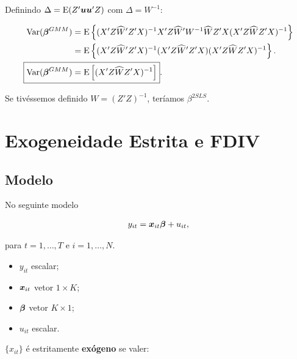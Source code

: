 \documentclass[11pt, oneside, a4paper, article]{article}
\numberwithin{equation}{section}
\begin{document}
\begin{description}
	\noindent
	Definindo $\Delta = \text{E}(Z' \boldsymbol{u}\boldsymbol{u}' Z)$ com $\Delta = W^{-1}$:

	\vspace{-1 em}
	\begin{align*}
		\Var( \betavec^{GMM} ) &=
		\E \left\{ 
			( X' Z \widehat{W}' Z' X )^{-1}
			X' Z \widehat{W}' W^{-1} \widehat{W} Z' X 
			( X' Z \widehat{W} Z' X )^{-1}
		\right\}
		\\ &=
		\E \left\{ 
			( X' Z \widehat{W}' Z' X )^{-1}
			( X' Z \widehat{W}' Z' X )
			( X' Z \widehat{W} Z' X )^{-1}
		\right\}.
		\\
		\Aboxed{
			\Var( \betavec^{GMM} ) &=
			\E \left[
				( X' Z \widehat{W} Z' X )^{-1}
		\right] }.
	\end{align*}

	\noindent
	Se tivéssemos definido $W = (Z'Z)^{-1}$, teríamos $\beta^{2SLS}$.


	\clearpage
	\section{Exogeneidade Estrita e FDIV}


	\subsection{Modelo}

	No seguinte modelo

	\vspace{-1 em}
	\begin{align*} 
		y_{it} = \boldsymbol{x}_{it} \boldsymbol{\beta} + u_{it},
	\end{align*}

	\noindent
	para
	$t = 1, \dots, T$ e $i = 1, \dots, N$.

	\begin{itemize}\itemsep0pt
		\item
			$y_{it}$ escalar;

		\item
			$\boldsymbol{x}_{it}$  vetor $1 \times K$;

		\item
			$\boldsymbol{\beta}$ vetor $K \times 1$;

		\item
			$u_{it}$ escalar.
	\end{itemize}

	\noindent
	$\{x_{it}\}$ é estritamente \textbf{exógeno} se valer:


\end{description}
\end{document}
